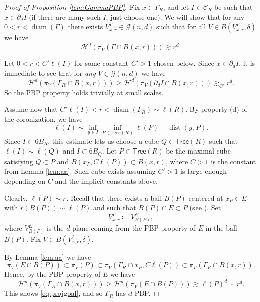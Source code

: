 \documentclass[11pt,reqno]{amsart}
\def\dG{{\mathcal{G}}}
\def\cC{{\mathscr{C}}}
\newcommand{\Tree}{\mathsf{Tree}}
\renewcommand{\d}{{\partial}}
\DeclareMathOperator{\diam}{diam}
\def\dist{\mathop\mathrm{dist}} 						%
\theoremstyle{definition}
\theoremstyle{remark}
\numberwithin{equation}{section}
\newcommand{\hd}{\mathcal{H}^d}
\theoremstyle{theorem}
\theoremstyle{definition}
\theoremstyle{remark}
\numberwithin{equation}{section}
\begin{document}
	\begin{proof}[Proof of Proposition \ref{lem:GammaPBP}]
		Fix $x\in\Gamma_R$, and let $I\in\cC_R$ be such that $x\in \d_d I$ (if there are many such $I$, just choose one). We will show that for any $0<r<\diam(\Gamma)$ there exists $V_{x,r}^\Gamma\in\dG(n,d)$ such that for all $V\in B(V_{x,r}^\Gamma,\delta)$ we have
		\begin{equation}\label{eq:projgoal}
		\hd(\pi_V(\Gamma\cap B(x,r)))\gtrsim r^d.
		\end{equation}
		
		Let $0<r<C'\ell(I)$ for some constant $C'>1$ chosen below. Since $x\in \d_d I$, it is immediate to see that for \emph{any} $V\in\dG(n,d)$ we have
		\begin{equation*}
			\hd(\pi_V(\Gamma_R\cap B(x,r)))\ge \hd(\pi_V(\d_dI\cap B(x,r)))\gtrsim_{C'} r^d.
		\end{equation*}
		So the PBP property holds trivially at small scales. 
		
		Assume now that $C'\ell(I)<r<\diam(\Gamma_R)\sim\ell(R)$. By property (d) of the coronization, we have
        \begin{equation*}
            \ell(I)\sim \inf_{y\in I}\inf_{P\in\Tree(R)}\ell(P)+\dist(y,P).
        \end{equation*}
  Since $I\subset 6B_R$, this estimate lets us choose a cube $Q\in\Tree(R)$ such that $\ell(I)\sim\ell(Q)$ and $I\subset 6B_Q$. Let $P\in\Tree(R)$ be the maximal cube satisfying $Q\subset P$ and $B(x_P,C\ell(P))\subset B(x,r)$, where $C>1$ is the constant from Lemma \ref{lem:aa}. Such cube exists assuming $C'>1$ is large enough depending on $C$ and the implicit constants above. 
  
  Clearly, $\ell(P)\sim r$. Recall that there exists a ball $B(P)$ centered at $x_{P}\in E$ with $r(B(P))\sim \ell(P)$ and such that $B(P)\cap E\subset P$ (see ). Set 
		\begin{equation*}
			V^{\Gamma}_{x,r} \coloneqq V^E_{B(P)},
		\end{equation*}
		where $V^E_{B(P)}$ is the $d$-plane coming from the PBP property of $E$ in the ball $B(P)$. Fix $V\in B(V^{\Gamma}_{x,r}, \delta)$. 

  By Lemma \ref{lem:aa} we have
  \begin{equation*}
      \pi_V(E\cap B(P))\subset \pi_V(P)\subset \pi_V(\Gamma_R\cap x_P,C\ell(P))\subset\pi_V(\Gamma_R\cap B(x,r)).
  \end{equation*}
  Hence, by the PBP property of $E$ we have
  \begin{equation*}
      \mathcal{H}^d(\pi_V(\Gamma_R\cap B(x,r)))\ge \mathcal{H}^d(\pi_V(E\cap B(P)))\gtrsim \ell(P)^d\sim r^d.
  \end{equation*}
  This shows \eqref{eq:projgoal}, and so $\Gamma_R$ has $d$-PBP.
	\end{proof}
\end{document}

